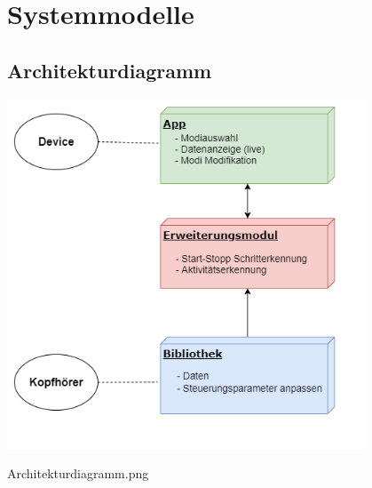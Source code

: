 \documentclass[a4paper,12pt]{article}
\begin{document}
\section{Systemmodelle}
  \subsection{Architekturdiagramm}
  \begin{center}
  	\vspace{100px}
  	\includegraphics[width=0.8\textwidth]{Architekturdiagramm.png}
  	\caption{Architekturdiagramm.png}
  \end{center}
  
\end{document}
